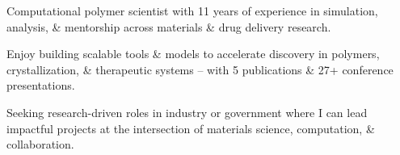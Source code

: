 \documentclass[letterpaper,12pt]{article}
\begin{document}
\begin{tabitemize}
  \item Computational polymer scientist with 11 years of experience in simulation, analysis, \& mentorship across materials \& drug delivery research.
  \item Enjoy building scalable tools \& models to accelerate discovery in polymers, crystallization, \& therapeutic systems -- with 5 publications \& 27+ conference presentations.
  \item Seeking research-driven roles in industry or government where I can lead impactful projects at the intersection of materials science, computation, \& collaboration.
\end{tabitemize}

\vspace{-1.5\baselineskip}
\end{document}
